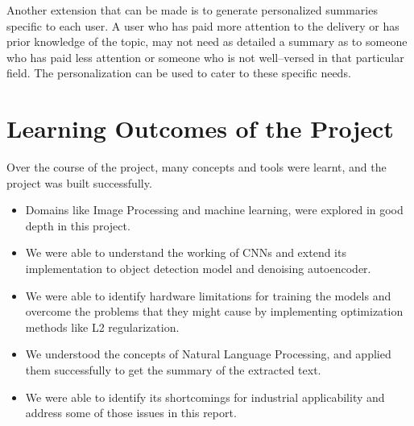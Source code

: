 Another extension that can be made is to generate personalized summaries specific to each user. A user who has paid more attention to the delivery or has prior knowledge of the topic, may not need as detailed a summary as to someone who has paid less attention or someone who is not well--versed in that particular field. The personalization can be used to cater to these specific needs.

\section{Learning Outcomes of the Project}
Over the course of the project, many concepts and tools were learnt, and the project was built successfully.
\begin{itemize}
\item Domains like Image Processing and machine learning, were explored in good depth in this project.
\item We were able to understand the working of CNNs and extend its implementation to object detection model and denoising autoencoder.
\item We were able to identify hardware limitations for training the models and overcome the problems that they might cause by implementing optimization methods like L2 regularization.
\item We understood the concepts of Natural Language Processing, and applied them successfully to get the summary of the extracted text.
\item We were able to identify its shortcomings for industrial applicability and address some of those issues in this report.

\end{itemize}

